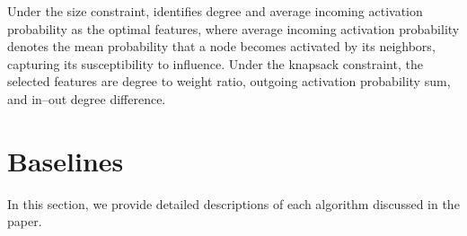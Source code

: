 Under the size constraint, \llm identifies degree and average incoming activation probability as the optimal features, where average incoming activation probability denotes the mean probability that a node becomes activated by its neighbors, capturing its susceptibility to influence. Under the knapsack constraint, the selected features are degree to weight ratio, outgoing activation probability sum, and in–out degree difference.










\section{Baselines}\label{appendix:baselines}

In this section, we provide detailed descriptions of each algorithm discussed in the paper.




